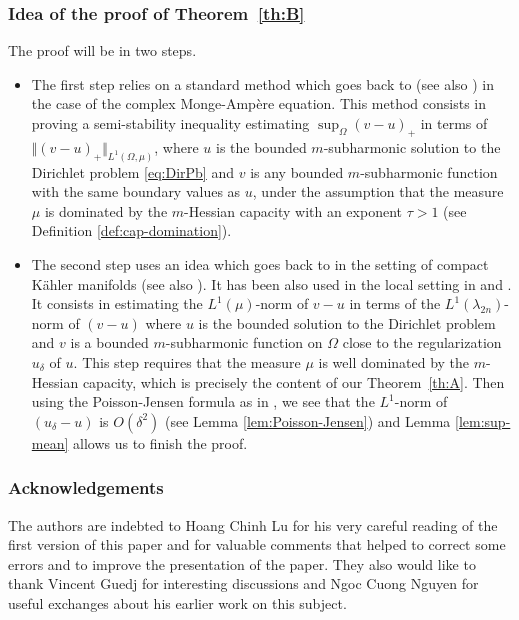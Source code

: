 \documentclass[11pt]{article}
\numberwithin{equation}{section}
\theoremstyle{definition}
\theoremstyle{plain}
\theoremstyle{definition}
\begin{document}
\subsubsection*{Idea of the proof of Theorem~\ref{th:B}}
The proof will be in two steps.
\begin{itemize}
\item
The first step relies on a standard method which goes back to \cite{EGZ09} (see also \cite{GKZ08}) in the case of the complex Monge-Ampère equation. This method consists in proving a semi-stability inequality estimating
$ \sup_{\Omega} (v-u)_+ $ in terms of $\Vert (v-u)_+\Vert_{L^{1} (\Omega,\mu)}$, where $u $ is the bounded $m$-subharmonic solution to the Dirichlet problem \eqref{eq:DirPb} and $v$ is any bounded $m$-subharmonic function with the same boundary values as $u$, under the assumption that the measure $\mu$ is dominated by the $m$-Hessian capacity with an exponent $\tau > 1$ (see Definition \ref{def:cap-domination}).

\item
The second step uses an idea which goes back to \cite{DDGKPZ15} in the setting of compact Kähler manifolds (see also \cite{GZ17}). It has been also used in the local setting in \cite{N18a} and \cite{KN19}. It consists in estimating the $L^1 (\mu)$-norm of $v - u$ in terms of the $L^1 (\lambda_{2 n})$-norm of $(v-u)$ where $u$ is the bounded solution to the Dirichlet problem and $v$ is a bounded $m$-subharmonic function on $\Omega$ close to the regularization $ u_\delta$ of $u$. This step requires that the measure $\mu$ is well dominated by the $m$-Hessian capacity, which is precisely the content of our Theorem~\ref{th:A}.
Then using the Poisson-Jensen formula as in \cite{GKZ08}, we see that the $L^1$-norm of $(u_\delta-u)$ is $O (\delta^2)$ (see Lemma \ref{lem:Poisson-Jensen}) and Lemma \ref{lem:sup-mean} allows us to finish the proof.
\end{itemize}

\subsubsection*{Acknowledgements}
The authors are indebted to Hoang Chinh Lu for his very careful reading of the first version of this paper and for valuable comments that helped to correct some errors and to improve the presentation of the paper. They also would like to thank Vincent Guedj for interesting discussions and Ngoc Cuong Nguyen for useful exchanges about his earlier work on this subject.
\end{document}

